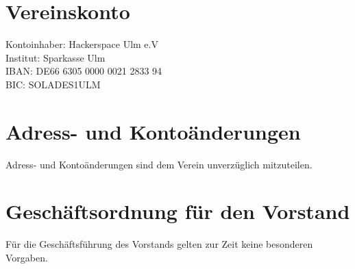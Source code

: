 \documentclass[a4paper, 12pt]{scrartcl}
\begin{document}
\section{Vereinskonto}
\begin{addmargin}[1in]{0cm}
Kontoinhaber:	Hackerspace Ulm e.V\\
Institut:	Sparkasse Ulm\\
IBAN:	DE66 6305 0000 0021 2833 94\\
BIC:	SOLADES1ULM\\
\end{addmargin}
\section{Adress- und Kontoänderungen}
Adress- und Kontoänderungen sind dem Verein unverzüglich mitzuteilen.
\section{Geschäftsordnung für den Vorstand}
Für die Geschäftsführung des Vorstands gelten zur Zeit keine besonderen Vorgaben. 
\end{document}
